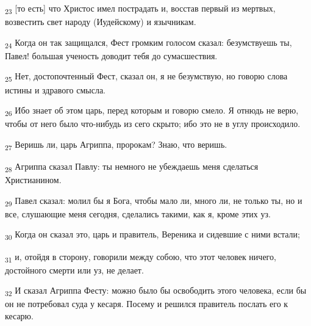 \begin{tcolorbox}
\textsubscript{23} [то есть] что Христос имел пострадать и, восстав первый из мертвых, возвестить свет народу (Иудейскому) и язычникам.
\end{tcolorbox}
\begin{tcolorbox}
\textsubscript{24} Когда он так защищался, Фест громким голосом сказал: безумствуешь ты, Павел! большая ученость доводит тебя до сумасшествия.
\end{tcolorbox}
\begin{tcolorbox}
\textsubscript{25} Нет, достопочтенный Фест, сказал он, я не безумствую, но говорю слова истины и здравого смысла.
\end{tcolorbox}
\begin{tcolorbox}
\textsubscript{26} Ибо знает об этом царь, перед которым и говорю смело. Я отнюдь не верю, чтобы от него было что-нибудь из сего скрыто; ибо это не в углу происходило.
\end{tcolorbox}
\begin{tcolorbox}
\textsubscript{27} Веришь ли, царь Агриппа, пророкам? Знаю, что веришь.
\end{tcolorbox}
\begin{tcolorbox}
\textsubscript{28} Агриппа сказал Павлу: ты немного не убеждаешь меня сделаться Христианином.
\end{tcolorbox}
\begin{tcolorbox}
\textsubscript{29} Павел сказал: молил бы я Бога, чтобы мало ли, много ли, не только ты, но и все, слушающие меня сегодня, сделались такими, как я, кроме этих уз.
\end{tcolorbox}
\begin{tcolorbox}
\textsubscript{30} Когда он сказал это, царь и правитель, Вереника и сидевшие с ними встали;
\end{tcolorbox}
\begin{tcolorbox}
\textsubscript{31} и, отойдя в сторону, говорили между собою, что этот человек ничего, достойного смерти или уз, не делает.
\end{tcolorbox}
\begin{tcolorbox}
\textsubscript{32} И сказал Агриппа Фесту: можно было бы освободить этого человека, если бы он не потребовал суда у кесаря. Посему и решился правитель послать его к кесарю.
\end{tcolorbox}
